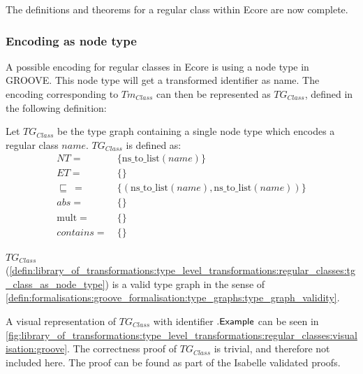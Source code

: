 The definitions and theorems for a regular class within Ecore are now complete. 

\subsubsection{Encoding as node type}

A possible encoding for regular classes in Ecore is using a node type in GROOVE. This node type will get a transformed identifier as name. The encoding corresponding to $Tm_{Class}$ can then be represented as $TG_{Class}$, defined in the following definition:

\begin{defin}
\label{defin:library_of_transformations:type_level_transformations:regular_classes:tg_class_as_node_type}
Let $TG_{Class}$ be the type graph containing a single node type which encodes a regular class $name$. $TG_{Class}$ is defined as:
\begin{align*}
NT =\ &\{\mathrm{ns\_\!to\_\!list}(name)\} \\
ET =\ &\{\} \\
\!\!\sqsubseteq\ =\ &\{( \mathrm{ns\_\!to\_\!list}(name), \mathrm{ns\_\!to\_\!list}(name) )\} \\
abs =\ &\{\} \\
\mathrm{mult} =\ &\{\} \\
contains =\ &\{\}
\end{align*}
\end{defin}

\begin{thm}
\label{defin:library_of_transformations:type_level_transformations:regular_classes:tg_class_as_node_type_correct}
$TG_{Class}$ (\cref{defin:library_of_transformations:type_level_transformations:regular_classes:tg_class_as_node_type}) is a valid type graph in the sense of \cref{defin:formalisations:groove_formalisation:type_graphs:type_graph_validity}.
\end{thm}

A visual representation of $TG_{Class}$ with identifier $.\mathsf{Example}$ can be seen in \cref{fig:library_of_transformations:type_level_transformations:regular_classes:visualisation:groove}. The correctness proof of $TG_{Class}$ is trivial, and therefore not included here. The proof can be found as part of the Isabelle validated proofs.

